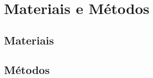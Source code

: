 
\chapter{Materiais e Métodos}\label{cap:materialemetodos}

\section{Materiais}\label{sec:materiais}

\section{Métodos}\label{sec:metodo}